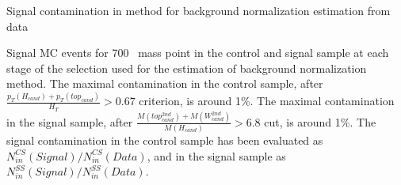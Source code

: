 \begin{frame}{Signal contamination in method for background normalization estimation from data}
\vspace{-.2cm}
\begin{center}
\end{center}

\vspace{-.2cm}
    \begin{block}{}
      \tiny \centering Signal MC events for 700 \GeVcc~mass point in the control and signal sample at each stage of the selection used for the estimation of background normalization method. The maximal contamination in the control sample, after $\frac{p_{T}(H_{cand})+p_{T}(top_{cand})}{H_{T}} > 0.67 $ criterion, is around 1\%. The maximal contamination in the signal sample, after $\frac{M(top^{2nd}_{cand})+M(W^{2nd}_{cand})}{M(H_{cand})}>6.8$ cut, is around 1\%. The signal contamination in the control sample has been evaluated as $N^{CS}_{in}(Signal)/N^{CS}_{in}(Data)$, and in the signal sample as $N^{SS}_{in}(Signal)/N^{SS}_{in}(Data)$.
    \end{block}

\end{frame}


